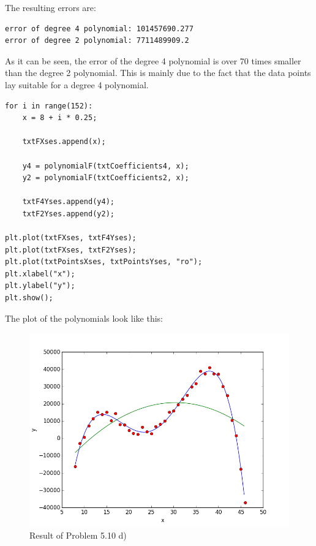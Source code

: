 The resulting errors are:

\begin{lstlisting}[caption=Squared errors of both polynomials, keywordstyle=\color{black}]
error of degree 4 polynomial: 101457690.277
error of degree 2 polynomial: 7711489909.2
\end{lstlisting}

As it can be seen, the error of the degree 4 polynomial is over 70 times smaller than the degree 2 polynomial. This is mainly due to the fact that the data points lay suitable for a degree 4 polynomial.

\begin{lstlisting}[caption=Plotting both polynomials]
for i in range(152):
	x = 8 + i * 0.25;
	
	txtFXses.append(x);
	
	y4 = polynomialF(txtCoefficients4, x);
	y2 = polynomialF(txtCoefficients2, x);
	
	txtF4Yses.append(y4);
	txtF2Yses.append(y2);

plt.plot(txtFXses, txtF4Yses);
plt.plot(txtFXses, txtF2Yses);
plt.plot(txtPointsXses, txtPointsYses, "ro");
plt.xlabel("x");
plt.ylabel("y");
plt.show();
\end{lstlisting}

The plot of the polynomials look like this:

\newpage

\begin{figure}[!ht]
\includegraphics[width=1\textwidth]{chapters/images/figure-5-10-d}
\caption{Result of Problem 5.10 d)}
\end{figure}


